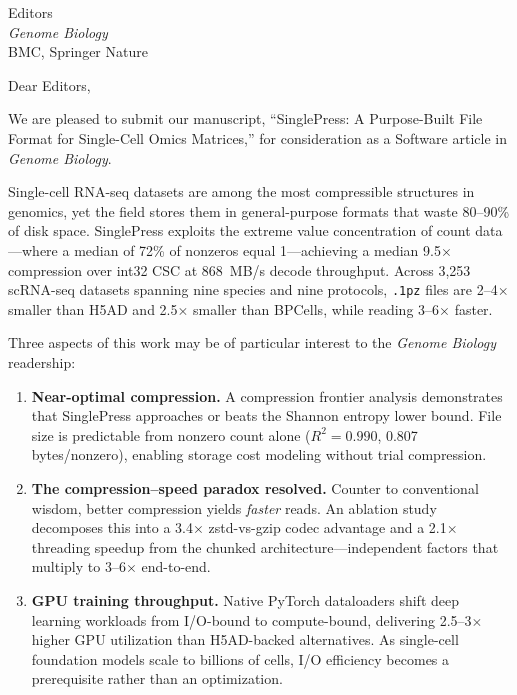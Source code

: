 \documentclass[11pt]{letter}
\begin{document}
\begin{letter}{Editors\\
\textit{Genome Biology}\\
BMC, Springer Nature}

\opening{Dear Editors,}

We are pleased to submit our manuscript, ``SinglePress: A Purpose-Built File Format for Single-Cell Omics Matrices,'' for consideration as a Software article in \textit{Genome Biology}.

Single-cell RNA-seq datasets are among the most compressible structures in genomics, yet the field stores them in general-purpose formats that waste 80--90\% of disk space.
SinglePress exploits the extreme value concentration of count data---where a median of 72\% of nonzeros equal 1---achieving a median 9.5$\times$ compression over int32 CSC at 868~MB/s decode throughput.
Across 3,253 scRNA-seq datasets spanning nine species and nine protocols, \texttt{.1pz} files are 2--4$\times$ smaller than H5AD and 2.5$\times$ smaller than BPCells, while reading 3--6$\times$ faster.

Three aspects of this work may be of particular interest to the \textit{Genome Biology} readership:

\begin{enumerate}
\item \textbf{Near-optimal compression.} A compression frontier analysis demonstrates that SinglePress approaches or beats the Shannon entropy lower bound.
File size is predictable from nonzero count alone ($R^2 = 0.990$, 0.807 bytes/nonzero), enabling storage cost modeling without trial compression.

\item \textbf{The compression--speed paradox resolved.} Counter to conventional wisdom, better compression yields \emph{faster} reads.
An ablation study decomposes this into a 3.4$\times$ zstd-vs-gzip codec advantage and a 2.1$\times$ threading speedup from the chunked architecture---independent factors that multiply to 3--6$\times$ end-to-end.

\item \textbf{GPU training throughput.} Native PyTorch dataloaders shift deep learning workloads from I/O-bound to compute-bound, delivering 2.5--3$\times$ higher GPU utilization than H5AD-backed alternatives.
As single-cell foundation models scale to billions of cells, I/O efficiency becomes a prerequisite rather than an optimization.
\end{enumerate}


\end{letter}
\end{document}
